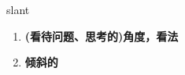 
\begin{frame}
{\huge slant}
\begin{center}
\begin{enumerate}\Large
  \item \textbf{(看待问题、思考的)角度，看法}
  \item \textbf{倾斜的}
\end{enumerate}
\end{center}
\end{frame}
